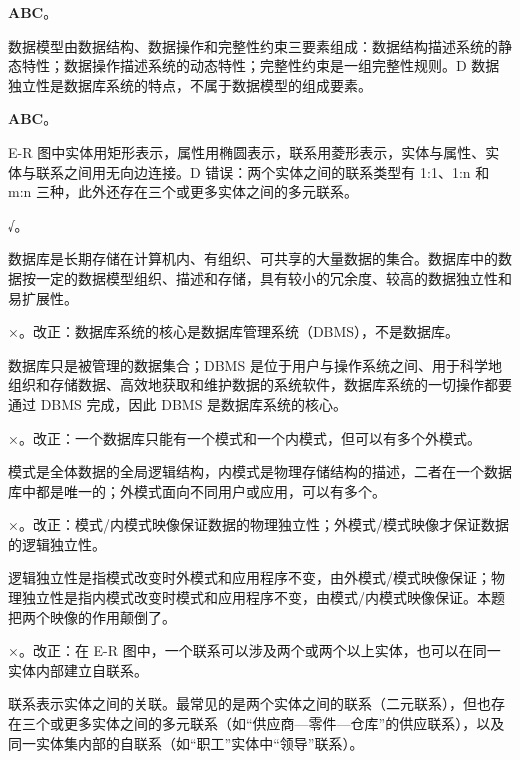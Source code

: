 \documentclass[a4paper,11pt]{article}
\begin{document}
\q \textbf{ABC}。\begin{analysis}数据模型由数据结构、数据操作和完整性约束三要素组成：数据结构描述系统的静态特性；数据操作描述系统的动态特性；完整性约束是一组完整性规则。D 数据独立性是数据库系统的特点，不属于数据模型的组成要素。\end{analysis}

\q \textbf{ABC}。\begin{analysis}E-R 图中实体用矩形表示，属性用椭圆表示，联系用菱形表示，实体与属性、实体与联系之间用无向边连接。D 错误：两个实体之间的联系类型有 1:1、1:n 和 m:n 三种，此外还存在三个或更多实体之间的多元联系。\end{analysis}


\q √。\begin{analysis}数据库是长期存储在计算机内、有组织、可共享的大量数据的集合。数据库中的数据按一定的数据模型组织、描述和存储，具有较小的冗余度、较高的数据独立性和易扩展性。\end{analysis}

\q ×。改正：数据库系统的核心是数据库管理系统（DBMS），不是数据库。\begin{analysis}数据库只是被管理的数据集合；DBMS 是位于用户与操作系统之间、用于科学地组织和存储数据、高效地获取和维护数据的系统软件，数据库系统的一切操作都要通过 DBMS 完成，因此 DBMS 是数据库系统的核心。\end{analysis}

\q ×。改正：一个数据库只能有一个模式和一个内模式，但可以有多个外模式。\begin{analysis}模式是全体数据的全局逻辑结构，内模式是物理存储结构的描述，二者在一个数据库中都是唯一的；外模式面向不同用户或应用，可以有多个。\end{analysis}

\q ×。改正：模式/内模式映像保证数据的物理独立性；外模式/模式映像才保证数据的逻辑独立性。\begin{analysis}逻辑独立性是指模式改变时外模式和应用程序不变，由外模式/模式映像保证；物理独立性是指内模式改变时模式和应用程序不变，由模式/内模式映像保证。本题把两个映像的作用颠倒了。\end{analysis}

\q ×。改正：在 E-R 图中，一个联系可以涉及两个或两个以上实体，也可以在同一实体内部建立自联系。\begin{analysis}联系表示实体之间的关联。最常见的是两个实体之间的联系（二元联系），但也存在三个或更多实体之间的多元联系（如“供应商—零件—仓库”的供应联系），以及同一实体集内部的自联系（如“职工”实体中“领导”联系）。\end{analysis}
\end{document}
